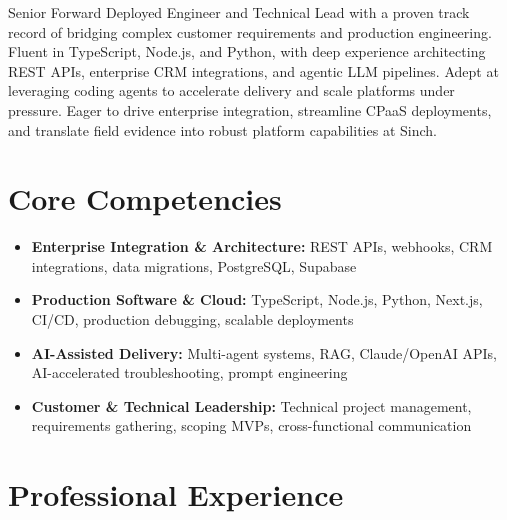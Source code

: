 \documentclass[11pt,a4paper,sans]{moderncv}
\begin{document}
\makecvtitle

Senior Forward Deployed Engineer and Technical Lead with a proven track record of bridging complex customer requirements and production engineering. Fluent in TypeScript, Node.js, and Python, with deep experience architecting REST APIs, enterprise CRM integrations, and agentic LLM pipelines. Adept at leveraging coding agents to accelerate delivery and scale platforms under pressure. Eager to drive enterprise integration, streamline CPaaS deployments, and translate field evidence into robust platform capabilities at Sinch.

\vspace{3pt}
\section{Core Competencies}
\begin{itemize}
\item \textbf{Enterprise Integration \& Architecture:} REST APIs, webhooks, CRM integrations, data migrations, PostgreSQL, Supabase
\item \textbf{Production Software \& Cloud:} TypeScript, Node.js, Python, Next.js, CI/CD, production debugging, scalable deployments
\item \textbf{AI-Assisted Delivery:} Multi-agent systems, RAG, Claude/OpenAI APIs, AI-accelerated troubleshooting, prompt engineering
\item \textbf{Customer \& Technical Leadership:} Technical project management, requirements gathering, scoping MVPs, cross-functional communication
\end{itemize}

\section{Professional Experience}
\vspace{1pt}

\end{document}
